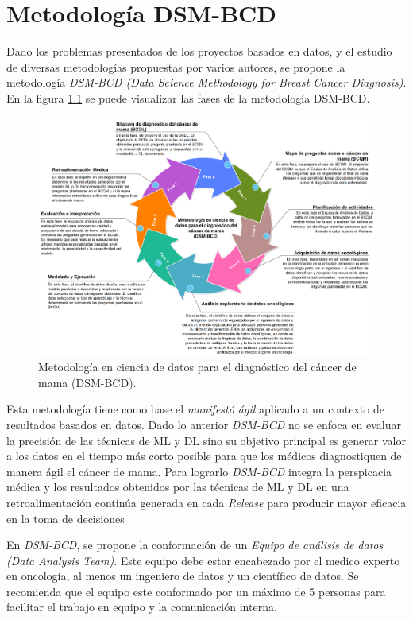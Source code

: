 \chapter{Metodología DSM-BCD}

Dado los problemas presentados de los proyectos basados en datos, y el estudio de diversas metodologías propuestas por varios autores, se propone la metodología \textit{DSM-BCD (Data Science Methodology for Breast Cancer Diagnosis)}. En la figura \ref{DSM-BCD} se puede visualizar las fases de la metodología DSM-BCD.

\begin{figure}[!htb]
	\centering
	\includegraphics[width=0.9
	\linewidth]{IMAGENES/DSM-BCD_SPANISH.pdf}
	\caption{Metodología en ciencia de datos para el diagnóstico del cáncer de mama 
		(DSM-BCD)\cite{DSMBCD023}.}
	\label{DSM-BCD}
\end{figure}

Esta metodología tiene como base el \textit{manifestó ágil} aplicado a un contexto de resultados basados en datos. Dado lo anterior \textit{DSM-BCD} no se enfoca en evaluar la precisión de las técnicas de ML y DL sino su objetivo principal es generar valor a los datos en el tiempo más corto posible para que los médicos diagnostiquen de manera ágil el cáncer de mama. Para lograrlo \textit{DSM-BCD} integra la perspicacia médica y los resultados obtenidos por las técnicas de ML y DL en una retroalimentación continúa generada en cada \textit{Release} para producir mayor eficacia en la toma de decisiones

En \textit{DSM-BCD}, se propone la conformación de un \textit{Equipo de análisis de datos (Data Analysis Team)}. Este equipo debe estar encabezado por el medico experto en oncología, al menos un ingeniero de datos y un científico de datos. Se recomienda que el equipo este conformado por un máximo de 5 personas para facilitar el trabajo en equipo y la comunicación interna.

